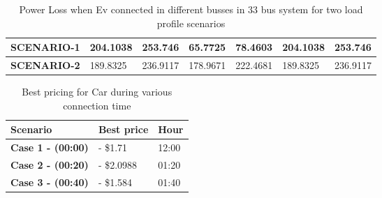 \begin{table}[h]
\begin{tabular}{|cl|ll|ll|ll|}
			\multicolumn{2}{|c|}{\textbf{SCENARIO-1}}                & \multicolumn{1}{l|}{204.1038}                                                                                  & 253.746                                                                                                         & \multicolumn{1}{l|}{65.7725}                                                                                   & 78.4603                                                                                                         & \multicolumn{1}{l|}{204.1038}                                                                                  & 253.746                                                                                                         \\ \hline
			\multicolumn{2}{|c|}{\textbf{SCENARIO-2}}                & \multicolumn{1}{l|}{189.8325}                                                                                  & 236.9117                                                                                                        & \multicolumn{1}{l|}{178.9671}                                                                                  & 222.4681                                                                                                        & \multicolumn{1}{l|}{189.8325}                                                                                  & 236.9117                                                                                                        \\ \hline
		\end{tabular}
		\caption{Power Loss when Ev connected in different busses in 33 bus system for two load profile scenarios}
	\end{table}


		\begin{table}[h]
			\centering
			\begin{tabular}{|l|l|l|}
				\hline
				\textbf{Scenario}         & \textbf{Best price} & \textbf{Hour} \\ \hline
				\textbf{Case 1 - (00:00)} & - \$1.71            & 12:00         \\ \hline
				\textbf{Case 2 - (00:20)} & - \$2.0988          & 01:20         \\ \hline
				\textbf{Case 3 - (00:40)} & - \$1.584           & 01:40         \\ \hline
			\end{tabular}
			\caption{Best pricing for Car during various connection time}
		\end{table}

